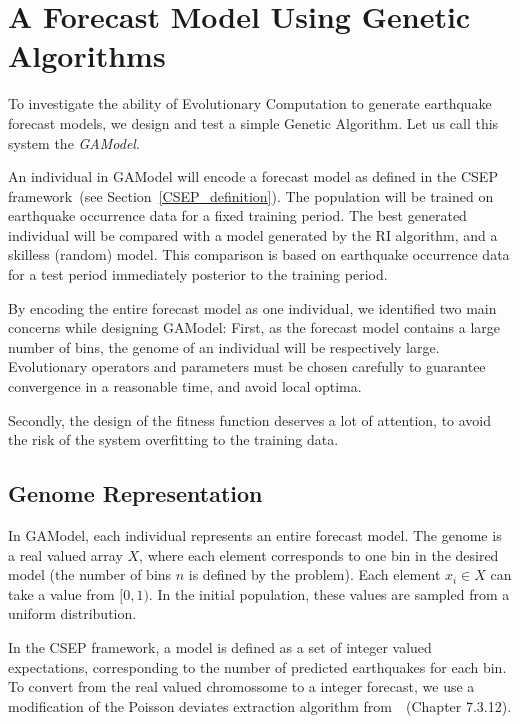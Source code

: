\documentclass{sig-alternate}
\begin{document}
\section{A Forecast Model Using Genetic Algorithms}\label{implementation}

To investigate the ability of Evolutionary Computation to generate
earthquake forecast models, we design and test a simple Genetic
Algorithm. Let us call this system the \emph{GAModel}.

An individual in GAModel will encode a forecast model as defined in
the CSEP framework~(see Section~\ref{CSEP_definition}). The population
will be trained on earthquake occurrence data for a fixed training
period. The best generated individual will be compared with a model
generated by the RI algorithm, and a skilless (random) model. This
comparison is based on earthquake occurrence data for a test period
immediately posterior to the training period.

By encoding the entire forecast model as one individual, we identified
two main concerns while designing GAModel: First, as the forecast
model contains a large number of bins, the genome of an individual
will be respectively large. Evolutionary operators and parameters must
be chosen carefully to guarantee convergence in a reasonable time, and
avoid local optima.

Secondly, the design of the fitness function deserves a lot of
attention, to avoid the risk of the system overfitting to the training
data.

\subsection{Genome Representation}

In GAModel, each individual represents an entire forecast model. The
genome is a real valued array $X$, where each element corresponds to
one bin in the desired model (the number of bins $n$ is defined by the
problem). Each element $x_i \in X$ can take a value from $[0,1)$. In
  the initial population, these values are sampled from a uniform
  distribution.

In the CSEP framework, a model is defined as a set of integer valued
expectations, corresponding to the number of predicted earthquakes for
each bin. To convert from the real valued chromossome to a integer
forecast, we use a modification of the Poisson deviates extraction
algorithm from~\cite{NumericalRecipes}~(Chapter 7.3.12).
\end{document}
